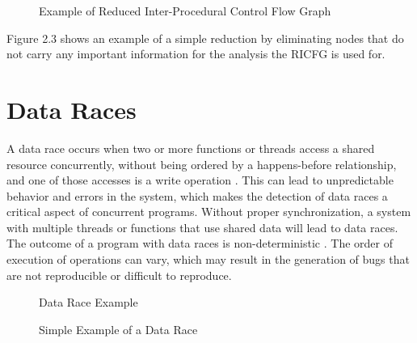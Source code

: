 \documentclass[
fancyheadings, %
%
%
]{stsreprt}
\begin{document}
{\begin{figure}[H]
	\caption{Example of Reduced Inter-Procedural Control Flow Graph}
\end{figure}

Figure 2.3 shows an example of a simple reduction by eliminating nodes that do not carry any important information for the analysis the RICFG is used for. 

\section{Data Races}

A data race occurs when two or more functions or threads access a shared resource concurrently, without being ordered by a happens-before relationship, and one of those accesses is a write operation \cite{chen2011}. This can lead to unpredictable behavior and errors in the system, which makes the detection of data races a critical aspect of concurrent programs.
Without proper synchronization, a system with multiple threads or functions that use shared data will lead to data races. The outcome of a program with data races is non-deterministic \cite{chen2011}. The order of execution of operations can vary, which may result in the generation of bugs that are not reproducible or difficult to reproduce. 
\begin{figure}[H]
	\centering
	\begin{algorithm}[H]
		\caption{Data Race Example}
		
		\BlankLine
		
		\BlankLine
	\end{algorithm}
	\caption{Simple Example of a Data Race}
\end{figure}

}
\end{document}
